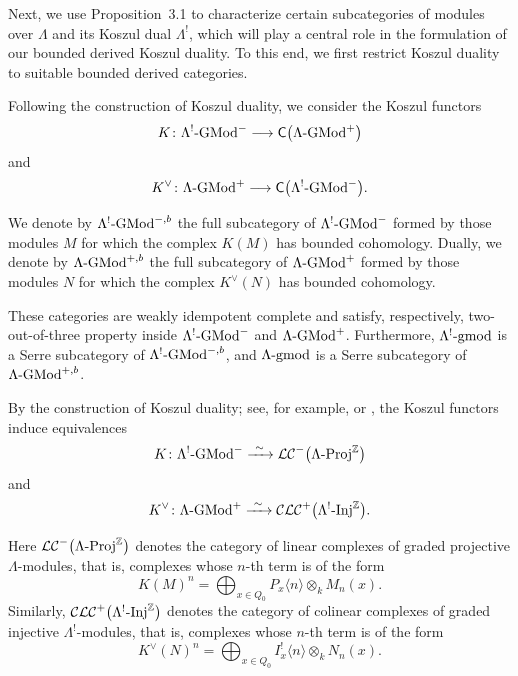\documentclass[11pt]{article}
\theoremstyle{definition}
\theoremstyle{remark}
\begin{document}
Next, we use Proposition~3.1 to characterize certain subcategories of modules over \(\Lambda\) and its Koszul dual \(\Lambda^{!}\), which will play a central role in the formulation of our bounded  derived Koszul duality. To this end, we first restrict Koszul duality to suitable bounded derived categories.

Following the construction of Koszul duality, we consider the Koszul functors
\[
K \colon
\Lambda^{!}\textup{-GMod}^{-}
\longrightarrow
\mathsf{C}\bigl(\Lambda\textup{-GMod}^{+}\bigr)
\]
and
\[
K^{\vee} \colon
\Lambda\textup{-GMod}^{+}
\longrightarrow
\mathsf{C}\bigl(\Lambda^{!}\textup{-GMod}^{-}\bigr).
\]

We denote by
\(\Lambda^{!}\textup{-}\mathrm{GMod}^{-,b}\)
the full subcategory of
\(\Lambda^{!}\textup{-}\mathrm{GMod}^{-}\)
formed by those modules \(M\) for which the complex \(K(M)\) has bounded
cohomology. Dually, we denote by
\(\Lambda\textup{-}\mathrm{GMod}^{+,b}\)
the full subcategory of
\(\Lambda\textup{-}\mathrm{GMod}^{+}\)
formed by those modules \(N\) for which the complex \(K^{\vee}(N)\) has bounded
cohomology.

These categories are weakly idempotent complete and satisfy, respectively, two-out-of-three  property  inside
\(\Lambda^{!}\textup{-}\mathrm{GMod}^{-}\) and
\(\Lambda\textup{-}\mathrm{GMod}^{+}\). Furthermore,
\(\Lambda^{!}\textup{-}\mathrm{gmod}\) is a Serre subcategory of
\(\Lambda^{!}\textup{-}\mathrm{GMod}^{-,b}\), and
\(\Lambda\textup{-}\mathrm{gmod}\) is a Serre subcategory of
\(\Lambda\textup{-}\mathrm{GMod}^{+,b}\).

\medskip 

By the construction of Koszul duality; see, for example, \cite{8,11,12} or \cite[Theorem~12]{30}, the Koszul functors induce equivalences
\[
K \colon
\Lambda^{!}\textup{-GMod}^{-}
\xrightarrow{\ \sim\ }
\mathcal{LC}^{-}\bigl(\Lambda\textup{-Proj}^{\mathbb Z}\bigr)
\]
and
\[
K^{\vee} \colon
\Lambda\textup{-GMod}^{+}
\xrightarrow{\ \sim\ }
\mathcal{CLC}^{+}\bigl(\Lambda^{!}\textup{-Inj}^{\mathbb Z}\bigr).
\]

Here
\( 
\mathcal{LC}^{-}\bigl(\Lambda\textup{-Proj}^{\mathbb Z}\bigr)
\)
denotes the category of linear complexes of graded projective \(\Lambda\)-modules, that is, complexes whose \(n\)-th term is of the form
\[
K(M)^n
=
\bigoplus_{x\in Q_0}
P_x\langle n\rangle
\otimes_k
M_n(x).
\]
Similarly,
\( 
\mathcal{CLC}^{+}\bigl(\Lambda^{!}\textup{-Inj}^{\mathbb Z}\bigr)
\)
denotes the category of colinear complexes of graded injective \(\Lambda^{!}\)-modules, that is, complexes whose \(n\)-th term is of the form
\[
K^{\vee}(N)^n
=
\bigoplus_{x\in Q_0}
I_x^{!}\langle n\rangle
\otimes_k
N_n(x).
\]
\end{document}
